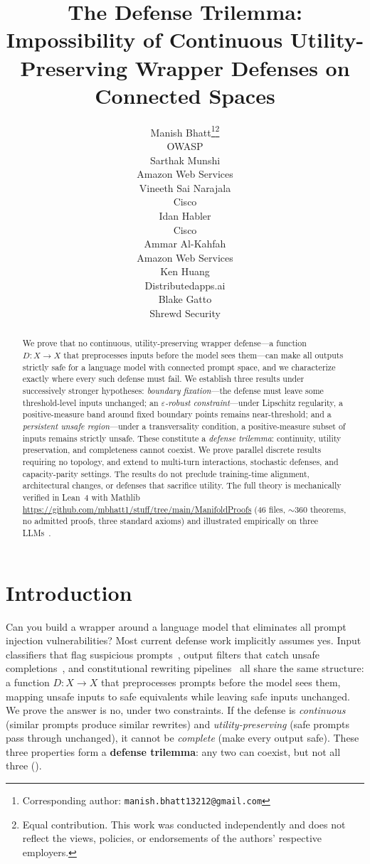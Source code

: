 \documentclass{article}
\title{The Defense Trilemma:\\
  Impossibility of Continuous Utility-Preserving Wrapper Defenses on Connected Spaces}
\author{%
  Manish Bhatt\thanks{Corresponding author: \texttt{manish.bhatt13212@gmail.com}}\thanks{Equal contribution. This work was conducted independently and does not reflect the views, policies, or endorsements of the authors' respective employers.} \\
  OWASP \\
  \And
  Sarthak Munshi\footnotemark[2] \\
  Amazon Web Services \\
  \And
  Vineeth Sai Narajala\footnotemark[2] \\
  Cisco \\
  \And
  Idan Habler\footnotemark[2] \\
  Cisco \\
  \And
  Ammar Al-Kahfah\footnotemark[2] \\
  Amazon Web Services \\
  \And
  Ken Huang \\
  Distributedapps.ai \\
  \And
  Blake Gatto \\
  Shrewd Security \\
}
\begin{document}
\maketitle
\begin{abstract}
We prove that no continuous, utility-preserving wrapper defense---a
function $D\colon X\to X$ that preprocesses inputs before the model
sees them---can make all outputs strictly safe for a language model
with connected prompt space, and we characterize exactly where every
such defense must fail. We establish three results under
successively stronger hypotheses: \emph{boundary fixation}---the defense must leave some
threshold-level inputs unchanged; an \emph{$\varepsilon$-robust
constraint}---under Lipschitz regularity, a positive-measure band
around fixed boundary points remains near-threshold; and a
\emph{persistent unsafe region}---under a transversality condition, a
positive-measure subset of inputs remains strictly unsafe. These
constitute a \emph{defense trilemma}: continuity, utility preservation,
and completeness cannot coexist. We prove parallel discrete results
requiring no topology, and extend to multi-turn interactions,
stochastic defenses, and capacity-parity settings. The results do not
preclude training-time alignment, architectural changes, or defenses
that sacrifice utility. The full theory is mechanically verified in
Lean~4 with Mathlib
\url{https://github.com/mbhatt1/stuff/tree/main/ManifoldProofs}
(46 files, ${\sim}360$ theorems, no admitted proofs, three standard
axioms) and illustrated empirically on three LLMs~\cite{munshi2026manifold}.
\end{abstract}


\section{Introduction}
\label{sec:intro}

Can you build a wrapper around a language model that eliminates all
prompt injection vulnerabilities? Most current defense work implicitly
assumes yes. Input classifiers that flag suspicious
prompts~\cite{alon2023detecting}, output filters that catch unsafe
completions~\cite{inan2023llama}, and constitutional rewriting
pipelines~\cite{bai2022constitutional} all share the same structure: a
function $D\colon X \to X$ that preprocesses prompts before the model
sees them, mapping unsafe inputs to safe equivalents while leaving safe
inputs unchanged. We prove the answer is no, under two constraints. If the defense
is \emph{continuous} (similar prompts produce similar rewrites) and
\emph{utility-preserving} (safe prompts pass through unchanged), it
cannot be \emph{complete} (make every output safe). These three
properties form a \textbf{defense trilemma}: any two can coexist, but
not all three ().
\end{document}
